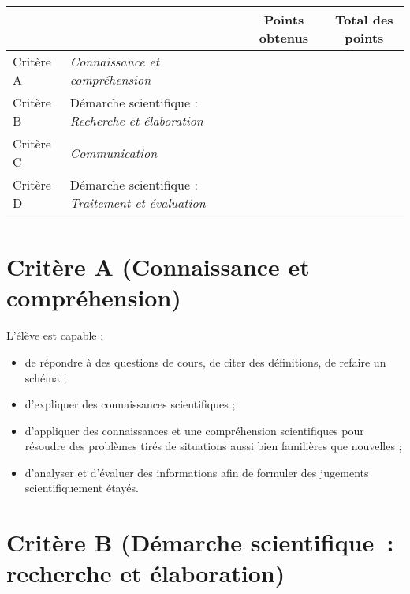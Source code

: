 
\vspace{3em}
\begin{center}
{\footnotesize %
\begin{tabularx}{.7\linewidth}{|l|X|c|c|}
\cline{3-4}
\multicolumn{2}{l|}{} & {\scriptsize Points obtenus} & {\scriptsize Total des points}    \\ \hline
Critère A   & \textsl{Connaissance et compréhension} & & \\ \hline
Critère B   & Démarche scientifique : \textsl{Recherche et élaboration}      & & \\ \hline
Critère C   & \textsl{Communication}                 & & \\ \hline
Critère D   & Démarche scientifique : \textsl{Traitement et évaluation}      & & \\ \hline
\multicolumn{2}{l|}{}   & \cellcolor{gris} & \cellcolor{gris} \\ \cline{3-4}
\end{tabularx}
} %
\end{center}
%



\section{Critère A (Connaissance et compréhension)}

L'élève est capable :
\begin{itemize}
\item de répondre à des questions de cours, de citer des définitions, de refaire un schéma ;
\item d’expliquer des connaissances scientifiques ;
\item d’appliquer des connaissances et une compréhension scientifiques pour résoudre des problèmes tirés de situations aussi bien familières que nouvelles ;
\item d’analyser et d’évaluer des informations afin de formuler des jugements scientifiquement étayés.
\end{itemize}


\section{Critère B (Démarche scientifique : recherche et élaboration)}

